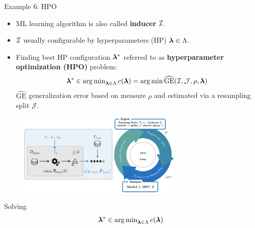 \documentclass[11pt,compress,t,notes=noshow, xcolor=table]{beamer}
\begin{document}
\begin{vbframe}{Example 6: HPO}
\vspace*{-0.2cm}
\begin{itemize}
	\item ML learning algorithm is also called \textbf{inducer} $\mathcal{I}$.
	\item $\mathcal{I}$ usually configurable by hyperparameters (HP) $\bm{\lambda} \in \Lambda$. 
	\item Finding best HP configuration $\bm{\lambda}^\ast$ referred to as \textbf{hyperparameter optimization (HPO)} problem: 
	$$
	\bm{\lambda}^\ast \in \operatorname{arg\,min}\nolimits_{\bm{\lambda} \in \Lambda} c(\bm{\lambda}) = \operatorname{arg\,min} \widehat{\text{GE}}(\mathcal{I}, \mathcal{J}, \rho, \bm{\lambda})
	$$
	$\widehat{\text{GE}}$ generalization error based on measure $\rho$ and estimated via a resampling split $\mathcal{J}$. 
\end{itemize}

\vspace*{-0.2cm}

\begin{figure}[h]
	\centering
	\includegraphics[width = 0.7\textwidth]{figure_man/hpo_loop_1.png}
\end{figure}

\framebreak 
		
Solving 
\vspace*{-0.2cm}
$$
\bm{\lambda}^\ast \in \operatorname{arg\,min}_{\bm{\lambda} \in \Lambda} c(\bm{\lambda})
$$


\end{vbframe}
\end{document}
